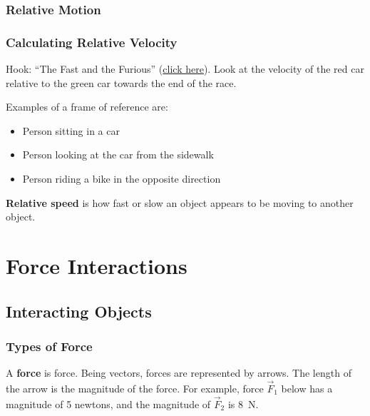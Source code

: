 \documentclass[dvipsnames]{article}
\newif\ifShowUnitII                              %
\begin{document}
\subsubsection{Relative Motion}

\subsubsection{Calculating Relative Velocity}

Hook: ``The Fast and the Furious'' (\href{https://youtu.be/yWiSjVHCT30?feature=shared&t=238}{click here}). Look at the velocity of the red car relative to the green car towards the end of the race.


Examples of a frame of reference are:

\begin{itemize}[itemsep=0pt,topsep=0pt]
    \item Person sitting in a car
    \item Person looking at the car from the sidewalk
    \item Person riding a bike in the opposite direction
\end{itemize}

\textbf{Relative speed} is how fast or slow an object appears to be moving to another object.




\fi

\clearpage

\section{Force Interactions}

\ifShowUnitII
\setcounter{example}{0}

\subsection{Interacting Objects}

\subsubsection{Types of Force}

A \textbf{\gls{force}} is \glsdesc{force}. Being vectors, forces are represented by arrows. The length of the arrow is the magnitude of the force. For example, force $\vec{F}_1$ below has a magnitude of 5 newtons, and the magnitude of $\vec{F}_2$ is \SI{8}{N}.
\end{document}
